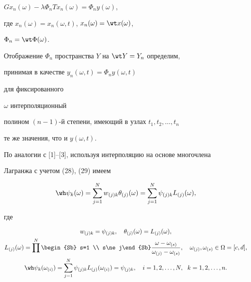 $Gx_n(\omega)-\lambda\Phi_n Tx_n(\omega)=\Phi_n y(\omega)$,


где $x_n(\omega)=x_n(\omega,t)$, $x_n(\omega)=\wt x(\omega)$,


$\Phi_n=\wt\Phi(\omega)$.


Отображение $\Phi_n$ пространства $Y$ на $\wt Y=Y_n$ определим,


принимая в качестве $y_n(\omega,t)=\Phi_n y(\omega,t)$


для фиксированного


$\omega$ интерполяционный


полином $(n-1)$-й степени, имеющий в узлах $t_1,t_2,\dotsc,t_n$


те же значения, что и $y(\omega,t)$.





По аналогии с [1]--[3], используя интерполяцию на основе многочлена


Лагранжа с учетом (28), (29) имеем


\begin{equation}


\wh\psi_k(\omega)=\sum^N_{j=1}w_{(j)k}\theta_{(j)}(\omega)=


\sum^N_{j=1}\psi_{(j)k}L_{(j)}(\omega),


\end{equation}


где


\begin{gather*}


w_{(j)k}=\psi_{(j)k},\quad \theta_{(j)}(\omega)=


L_{(j)}(\omega), \\


L_{(j)}(\omega)=\prod^N\begin{Sb} s=1 \\ s\ne j\end{Sb}


\frac{\omega-\omega_{(s)}}{\omega_{(j)}-\omega_{(s)}},\quad


\omega_{(j)},\omega_{(s)}\in\Omega=[c,d], \\


\wh\psi_k(\omega_{(i)})=\sum^N_{j=1}\psi_{(j)k}L_{(j)}


(\omega_{(i)})=\psi_{(j)k},\quad i=1,2,\dotsc,N,\ \;


k=1,2,\dotsc,n.


\end{gather*}





